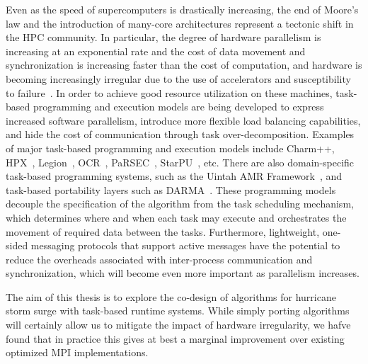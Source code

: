 Even as the speed of supercomputers is drastically increasing, the end of Moore's law and the introduction of many-core architectures represent a tectonic shift in the HPC community.
In particular, the degree of hardware parallelism is increasing at an exponential rate and the cost of data movement and synchronization is increasing faster than the cost of computation, and hardware is becoming increasingly irregular due to the use of accelerators and susceptibility to failure~\cite{Kogge2013}.
In order to achieve good resource utilization on these machines, task-based programming and execution models are being developed to express increased software parallelism, introduce more flexible load balancing capabilities, and hide the cost of communication through task over-decomposition. 
Examples of major task-based programming and execution models include Charm++, HPX~\cite{hpx2}, Legion~\cite{legion}, OCR~\cite{ocr}, PaRSEC~\cite{parsec}, StarPU~\cite{starpu}, etc.
There are also domain-specific task-based programming systems, such as the Uintah AMR Framework~\cite{uintah}, and task-based portability layers such as DARMA~\cite{darma}.
These programming models decouple the specification of the algorithm from the task scheduling mechanism, which determines where and when each task may execute and orchestrates the movement of required data between the tasks.
Furthermore, lightweight, one-sided messaging protocols that support active messages have the potential to reduce the overheads associated with inter-process communication and synchronization, which will become even more important as parallelism increases.

The aim of this thesis is to explore the co-design of algorithms for hurricane storm surge with task-based runtime systems. While simply porting algorithms will certainly allow us to mitigate the impact of hardware irregularity, we hafve found that in practice this gives at best a marginal improvement over existing optimized MPI implementations. 

